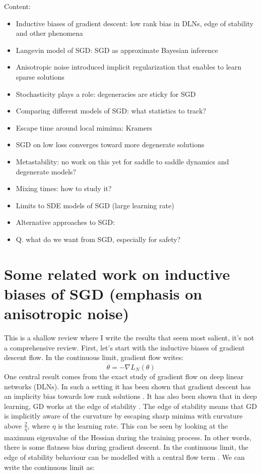 \documentclass[11pt]{article}
\begin{document}
Content:
\begin{itemize}
    \item Inductive biases of gradient descent: low rank bias in DLNs, edge of stability and other phenomena 
    \item Langevin model of SGD: SGD as approximate Bayesian inference
    \item Anisotropic noise introduced implicit regularization that enables to learn sparse solutions
    \item Stochasticity plays a role: degeneracies are sticky for SGD
    \item Comparing different models of SGD: what statistics to track?
    \item Escape time around local mimima: Kramers
    \item SGD on low loss converges toward more degenerate solutions
    \item Metastability: no work on this yet for saddle to saddle dynamics and degenerate models?
    \item Mixing times: how to study it?
    \item Limits to SDE models of SGD (large learning rate)
    \item Alternative approaches to SGD: 
    \item Q. what do we want from SGD, especially for safety?
\end{itemize}

\section*{Some related work on inductive biases of SGD (emphasis on anisotropic noise)}
This is a shallow review where I write the results that seem most salient, it's not a comprehensive review. First, let's start with the inductive biases of gradient descent flow. In the continuous limit, gradient flow writes:
\begin{equation}
    \dot{\theta} = -\nabla L_N(\theta)
\end{equation}
One central result comes from the exact study of gradient flow on deep linear networks (DLNs). In such a setting it has been shown that gradient descent has an implicity bias towards low rank solutions \citep{saxe2013exact}. It has also been shown that in deep learning, GD works at the edge of stability \citep{cohen2021gradient}. The edge of stability means that GD is implicitly aware of the curvature by escaping sharp minima with curvature above $\frac{2}{\eta}$, where $\eta$ is the learning rate. This can be seen by looking at the maximum eigenvalue of the Hessian during the training process. In other words, there is some flatness bias during gradient descent. In the continuous limit, the edge of stability behaviour can be modelled with a central flow term \citep{cohen2024understanding}. We can write the continuous limit as:
\end{document}
